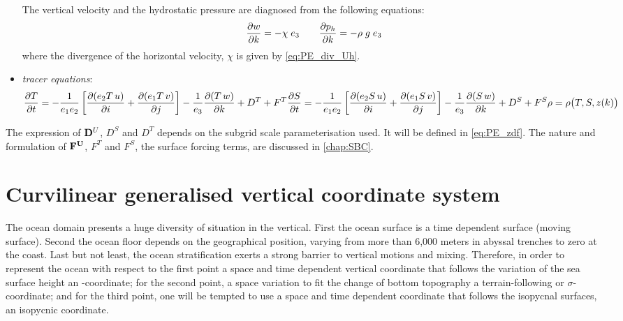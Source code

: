 \documentclass[../main/NEMO_manual]{subfiles}
\begin{document}
\begin{itemize}
  The vertical velocity and the hydrostatic pressure are diagnosed from the following equations:
  \[
    \pd[w]{k} = - \chi \; e_3 \qquad 
    \pd[p_h]{k} = - \rho \; g \; e_3
  \]
  where the divergence of the horizontal velocity, $\chi$ is given by \autoref{eq:PE_div_Uh}.
\item \textit{tracer equations}:
  \[
    \pd[T]{t} = - \frac{1}{e_1 e_2} \lt[ \pd[(e_2 T \, u)]{i} + \pd[(e_1 T \, v)]{j} \rt]
                - \frac{1}{e_3} \pd[(T \, w)]{k} + D^T + F^T \\
    \pd[S]{t} = - \frac{1}{e_1 e_2} \lt[ \pd[(e_2 S \, u)]{i} + \pd[(e_1 S \, v)]{j} \rt]
                - \frac{1}{e_3} \pd[(S \, w)]{k} + D^S + F^S
    \rho = \rho \big( T,S,z(k) \big)
  \]
\end{itemize}

The expression of $\vect D^{U}$, $D^{S}$ and $D^{T}$ depends on the subgrid scale parameterisation used.
It will be defined in \autoref{eq:PE_zdf}.
The nature and formulation of $\vect F^{\vect U}$, $F^T$ and $F^S$, the surface forcing terms,
are discussed in \autoref{chap:SBC}.

\newpage

\section{Curvilinear generalised vertical coordinate system}
\label{sec:PE_gco}

The ocean domain presents a huge diversity of situation in the vertical.
First the ocean surface is a time dependent surface (moving surface).
Second the ocean floor depends on the geographical position,
varying from more than 6,000 meters in abyssal trenches to zero at the coast.
Last but not least, the ocean stratification exerts a strong barrier to vertical motions and mixing.
Therefore, in order to represent the ocean with respect to
the first point a space and time dependent vertical coordinate that follows the variation of the sea surface height
\eg an \zstar-coordinate;
for the second point, a space variation to fit the change of bottom topography
\eg a terrain-following or $\sigma$-coordinate;
and for the third point, one will be tempted to use a space and time dependent coordinate that
follows the isopycnal surfaces, \eg an isopycnic coordinate.
\end{document}
